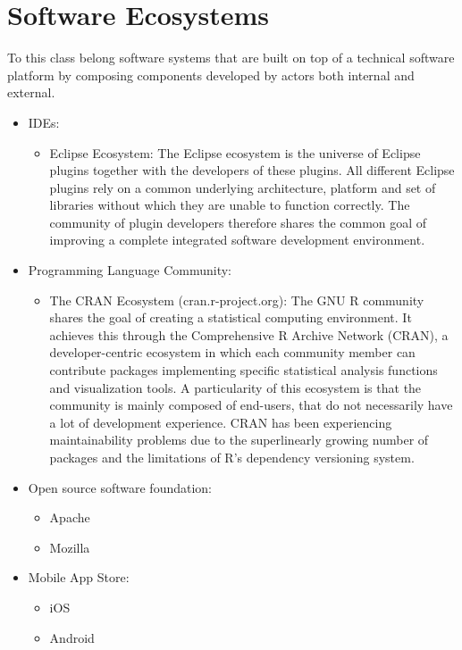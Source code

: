 \chapter{Software Ecosystems}\label{ch:softwareEcosystems}
To this class belong software systems that are built on top of a technical software platform by composing components developed by actors both internal and external.
                                               	
\begin{itemize}
\item IDEs: 
\begin{itemize}
  \item Eclipse Ecosystem: The Eclipse ecosystem is the universe of Eclipse plugins together with the developers of these plugins. All different Eclipse plugins rely on a common underlying architecture, platform and set of libraries without which they are unable to function correctly. The community of plugin developers therefore shares the common goal of improving a complete integrated software development environment.        	 
\end{itemize}
                
\item Programming Language Community: 
\begin{itemize}
  \item The CRAN Ecosystem (cran.r-project.org): The GNU R community shares the
  goal of creating a statistical computing environment. It achieves this through the Comprehensive R Archive Network (CRAN), a developer-centric ecosystem in which each community member can contribute packages implementing specific statistical analysis functions and visualization tools. A particularity of this ecosystem is that the community is mainly composed of end-users, that do not necessarily have a lot of development experience. CRAN has been experiencing maintainability problems due to the superlinearly growing number of packages and the limitations of R’s dependency versioning system.
\end{itemize}                                        	

\item Open source software foundation: 
\begin{itemize}
  \item Apache
  \item Mozilla
\end{itemize}          

\item Mobile App Store: 
\begin{itemize}
  \item iOS
  \item Android
\end{itemize}          
\end{itemize}